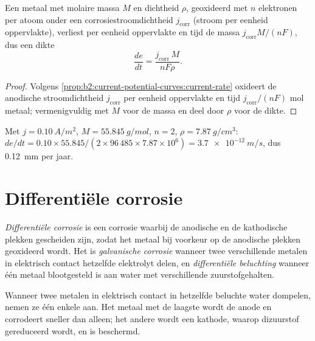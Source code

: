 \begin{proposition}[Corrosiesnelheid]\label{prop:b2:corrosion:rate}
Een metaal met molaire massa $M$ en dichtheid $\rho$, geoxideerd met $n$ elektronen per
atoom onder een corrosiestroomdichtheid $j_{\text{corr}}$ (stroom per eenheid oppervlakte),
verliest per eenheid oppervlakte en tijd de massa $j_{\text{corr}}M/(nF)$, dus een
dikte
\[
  \frac{de}{dt} = \frac{j_{\text{corr}}\,M}{nF\rho} .
\]
\end{proposition}

\begin{proof}
Volgens \cref{prop:b2:current-potential-curves:current-rate} oxideert de anodische
stroomdichtheid $j_{\text{corr}}$ per eenheid oppervlakte en tijd $j_{\text{corr}}/(nF)$ mol metaal;
vermenigvuldig met $M$ voor de massa en deel door $\rho$ voor de dikte.
\end{proof}

\begin{example}\label{ex:b2:corrosion:rate}
Met $j = \qty{0.10}{A/m^2}$, $M = \qty{55.845}{g/mol}$, $n = 2$, $\rho =
\qty{7.87}{g/cm^3}$: $de/dt = 0.10 \times 55.845/(2 \times 96\,485 \times 7.87
\times 10^6) = \qty{3.7e-12}{m/s}$, dus \qty{0.12}{mm} per jaar.
\end{example}

\section{Differentiële corrosie}

\begin{definition}\label{def:b2:corrosion:differential}
\emph{Differentiële corrosie} is een corrosie
waarbij de anodische en de kathodische plekken gescheiden zijn, zodat het metaal
bij voorkeur op de anodische plekken geoxideerd wordt. Het is \emph{galvanische
corrosie} wanneer twee verschillende metalen in elektrisch
contact hetzelfde elektrolyt delen, en \emph{differentiële
beluchting} wanneer één metaal blootgesteld is aan water met
verschillende zuurstofgehalten.
\end{definition}

\begin{proposition}\label{prop:b2:corrosion:galvanic}
Wanneer twee metalen in elektrisch contact in hetzelfde beluchte water dompelen, nemen ze
één enkele  aan. Het metaal met de laagste 
wordt de anode en corrodeert sneller dan alleen; het andere wordt een kathode,
waarop dizuurstof gereduceerd wordt, en is beschermd.
\end{proposition}

